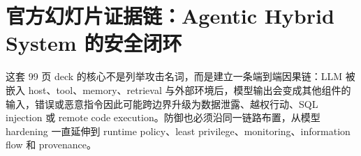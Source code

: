 \section{官方幻灯片证据链：Agentic Hybrid System 的安全闭环}

这套 99 页 deck 的核心不是列举攻击名词，而是建立一条端到端因果链：LLM 被嵌入 host、tool、memory、retrieval 与外部环境后，模型输出会变成其他组件的输入，错误或恶意指令因此可能跨边界升级为数据泄露、越权行动、SQL injection 或 remote code execution。防御也必须沿同一链路布置，从模型 hardening 一直延伸到 runtime policy、least privilege、monitoring、information flow 和 provenance。

